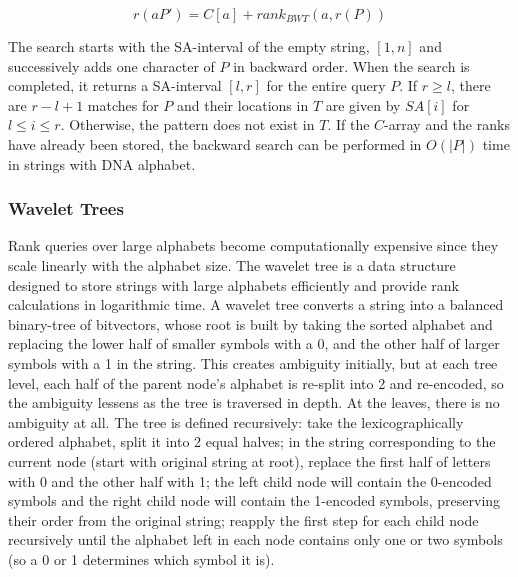 \documentclass[runningheads,a4paper]{llncs}
\begin{document}
\begin{equation} 
r(aP')=C[a]+rank_{BWT}(a,r(P))
\end{equation}

The search starts with the SA-interval of the empty string, $[1,n]$ and successively adds one character of $P$ in backward order. When the search is completed, it returns a SA-interval $[l,r]$ for the entire query $P$. If $r \geq l$, there are $r-l+1$ matches for $P$ and their locations in $T$ are given by $SA[i]$ for $l \leq i \leq r$. Otherwise, the pattern does not exist in $T$. If the $C$-array and the ranks have already been stored, the backward search can be performed in $O(|P|)$ time in strings with DNA alphabet.

\subsubsection{Wavelet Trees}
Rank queries over large alphabets become  computationally expensive since they scale linearly with the alphabet size. The wavelet tree is a data structure designed to store strings with large alphabets efficiently and provide rank calculations in logarithmic time. A wavelet tree converts a string into a balanced binary-tree of bitvectors, whose root is built by taking the sorted alphabet and replacing the lower half of smaller symbols with a 0, and the other half of larger symbols with a 1 in the string. This creates ambiguity initially, but at each tree level, each half of the parent node's alphabet is re-split into 2 and re-encoded, so the ambiguity lessens as the tree is traversed in depth. At the leaves, there is no ambiguity at all. The tree is defined recursively: take the lexicographically ordered alphabet, split it into 2 equal halves; in the string corresponding to the current node (start with original string at root), replace the first half of letters with 0 and the other half with 1; the left child node will contain the 0-encoded symbols and the right child node will contain the 1-encoded symbols, preserving their order from the original string; reapply the first step for each child node recursively until the alphabet left in each node contains only one or two symbols (so a 0 or 1 determines which symbol it is).
\end{document}
